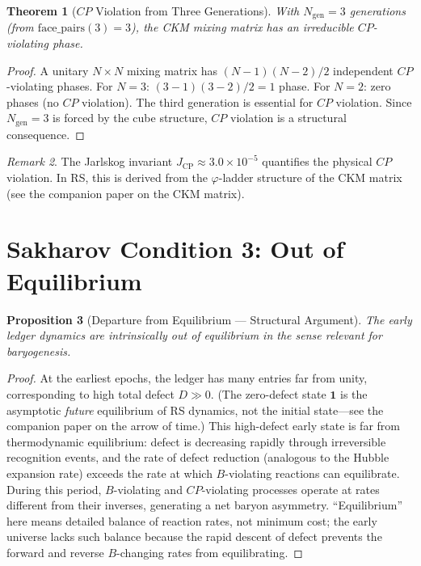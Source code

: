\documentclass[12pt,a4paper]{article}
\newtheorem{theorem}{Theorem}[section]
\newtheorem{proposition}[theorem]{Proposition}
\theoremstyle{definition}
\theoremstyle{remark}
\newtheorem{remark}[theorem]{Remark}
\begin{document}
\begin{theorem}[$CP$ Violation from Three Generations]
\label{thm:cp}
With $N_{\mathrm{gen}} = 3$ generations (from
$\mathrm{face\_pairs}(3) = 3$), the CKM mixing matrix has an
irreducible $CP$-violating phase.
\end{theorem}

\begin{proof}
A unitary $N \times N$ mixing matrix has
$(N-1)(N-2)/2$ independent $CP$-violating phases.  For $N = 3$:
$(3-1)(3-2)/2 = 1$ phase.  For $N = 2$: zero phases (no $CP$
violation).  The third generation is essential for $CP$ violation.
Since $N_{\mathrm{gen}} = 3$ is forced by the cube structure,
$CP$ violation is a structural consequence.
\end{proof}

\begin{remark}
The Jarlskog invariant $J_{\mathrm{CP}} \approx 3.0 \times 10^{-5}$
quantifies the physical $CP$ violation.  In RS, this is derived from
the $\varphi$-ladder structure of the CKM matrix (see the companion
paper on the CKM matrix).
\end{remark}

\section{Sakharov Condition 3: Out of Equilibrium}
\label{sec:out-of-eq}

\begin{proposition}[Departure from Equilibrium --- Structural Argument]
\label{thm:out-eq}
The early ledger dynamics are intrinsically out of equilibrium in
the sense relevant for baryogenesis.
\end{proposition}

\begin{proof}
At the earliest epochs, the ledger has many entries far from unity,
corresponding to high total defect $D \gg 0$.  (The zero-defect
state $\mathbf{1}$ is the asymptotic \emph{future} equilibrium of RS
dynamics, not the initial state---see the companion paper on the
arrow of time.)  This high-defect early state is far from
thermodynamic equilibrium: defect is decreasing rapidly through
irreversible recognition events, and the rate of defect reduction
(analogous to the Hubble expansion rate) exceeds the rate at which
$B$-violating reactions can equilibrate.  During this period,
$B$-violating and $CP$-violating processes operate at rates different
from their inverses, generating a net baryon asymmetry.
``Equilibrium'' here means detailed balance of reaction rates, not
minimum cost; the early universe lacks such balance because the rapid
descent of defect prevents the forward and reverse $B$-changing rates
from equilibrating.
\end{proof}
\end{document}
